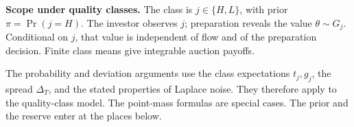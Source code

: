 
\protect{}\label{oa-a-quality-class-scope}
\noindent\textbf{Scope under quality classes.}
The class is \(j\in\{H,L\}\), with prior \(\pi=\Pr(j=H)\).
The investor observes \(j\); preparation reveals the value \(\theta\sim G_j\).
Conditional on \(j\), that value is independent of flow and of the preparation decision.
Finite class means give integrable auction payoffs.
\par
The probability and deviation arguments use the class expectations
\(t_j,g_j\), the spread \(\Delta_T\), and the stated properties of Laplace noise.
They therefore apply to the quality-class model.
The point-mass formulas are special cases.
The prior and the reserve enter at the places below.

